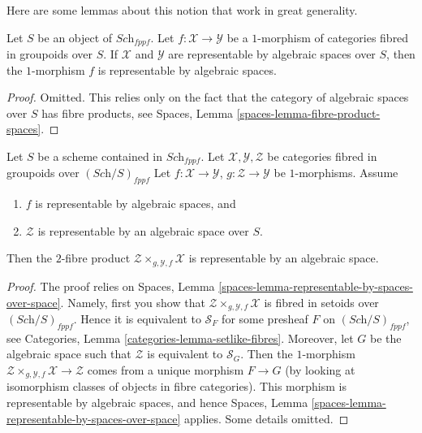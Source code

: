 \noindent
Here are some lemmas about this notion that work in great generality.

\begin{lemma}
\label{lemma-morphism-spaces-gives-representable-by-spaces}
Let $S$ be an object of $\textit{Sch}_{fppf}$.
Let $f : \mathcal{X} \to \mathcal{Y}$
be a $1$-morphism of categories fibred in groupoids over $S$.
If $\mathcal{X}$ and $\mathcal{Y}$ are representable by
algebraic spaces over $S$, then the $1$-morphism $f$
is representable by algebraic spaces.
\end{lemma}

\begin{proof}
Omitted. This relies only on the fact that
the category of algebraic spaces over $S$ has fibre products,
see Spaces, Lemma \ref{spaces-lemma-fibre-product-spaces}.
\end{proof}

\begin{lemma}
\label{lemma-base-change-by-space-representable-by-space}
Let $S$ be a scheme contained in $\textit{Sch}_{fppf}$.
Let $\mathcal{X}, \mathcal{Y}, \mathcal{Z}$
be categories fibred in groupoids over $(\textit{Sch}/S)_{fppf}$
Let $f : \mathcal{X} \to \mathcal{Y}$,
$g : \mathcal{Z} \to \mathcal{Y}$ be $1$-morphisms.
Assume
\begin{enumerate}
\item $f$ is representable by algebraic spaces, and
\item $\mathcal{Z}$ is representable by an algebraic space over $S$.
\end{enumerate}
Then the $2$-fibre product
$\mathcal{Z} \times_{g, \mathcal{Y}, f} \mathcal{X}$
is representable by an algebraic space.
\end{lemma}

\begin{proof}
The proof relies on
Spaces, Lemma \ref{spaces-lemma-representable-by-spaces-over-space}.
Namely, first you show that
$\mathcal{Z} \times_{g, \mathcal{Y}, f} \mathcal{X}$
is fibred in setoids over $(\textit{Sch}/S)_{fppf}$.
Hence it is equivalent to $\mathcal{S}_F$ for some presheaf
$F$ on $(\textit{Sch}/S)_{fppf}$, see
Categories, Lemma \ref{categories-lemma-setlike-fibres}.
Moreover, let $G$ be the algebraic space such that
$\mathcal{Z}$ is equivalent to $\mathcal{S}_G$. Then the
$1$-morphism
$\mathcal{Z} \times_{g, \mathcal{Y}, f} \mathcal{X} \to \mathcal{Z}$
comes from a unique morphism $F \to G$ (by looking at isomorphism
classes of objects in fibre categories). This morphism is representable
by algebraic spaces, and hence 
Spaces, Lemma \ref{spaces-lemma-representable-by-spaces-over-space}
applies. Some details omitted.
\end{proof}

